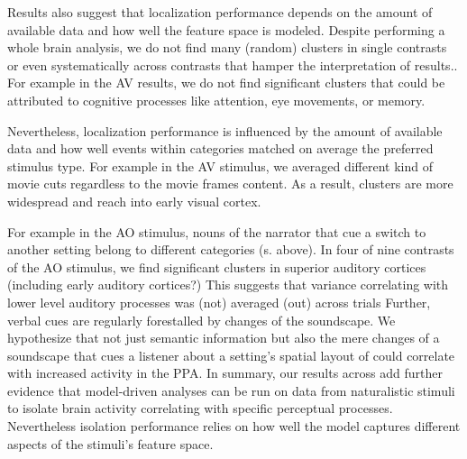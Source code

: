 \documentclass[english]{article}
\begin{document}
Results also suggest that localization performance depends on the
amount of available data and how well the feature space is modeled.
Despite performing a whole brain analysis, we do not find many (random) clusters
in single contrasts or even systematically across contrasts that hamper the
interpretation of results..
For example in the AV results, we do not find significant clusters that could be
attributed to cognitive processes like attention, eye movements, or
memory.

Nevertheless, localization performance is influenced by the amount of available
data and how well
events within categories matched on average the preferred stimulus type.
For example in the AV stimulus, we averaged different kind of movie cuts
regardless to the movie frames content.
As a result, clusters are more widespread and reach into early visual cortex.



For example in the AO stimulus, nouns of the narrator that cue a switch to
another setting belong to different categories (s. above).
In four of nine contrasts of the AO stimulus, we find significant clusters in
superior auditory cortices (including early auditory cortices?)
This suggests that variance correlating with lower level auditory processes was
(not) averaged (out) across trials
Further, verbal cues are regularly forestalled by changes of the
soundscape.
We hypothesize that not just semantic information but also the mere changes of a
soundscape that cues a listener about a setting's spatial layout of could
correlate with increased activity in the PPA.
In summary, our results across add further evidence that model-driven analyses
can be run on data from naturalistic stimuli to isolate brain activity
correlating with specific perceptual processes.
Nevertheless isolation performance relies on how well the model captures
different aspects of the stimuli's feature space.
\end{document}
